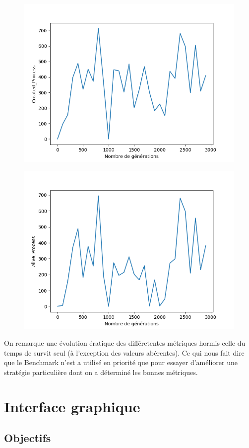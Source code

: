 \documentclass[a4paper,12pt]{article} %
\begin{document}
\begin{figure}[!ht]
\begin{minipage}{.5\textwidth}
  \label{fig:test4}
\end{minipage}
\begin{minipage}{.5\textwidth}
  \centering
  \includegraphics[width=.5\linewidth]{images/Created_Process.png}
  \label{fig:test5}
\end{minipage}
\begin{minipage}{.5\textwidth}
  \centering
  \includegraphics[width=.5\linewidth]{images/Alive_Process.png}
  \label{fig:test6}
\end{minipage}

\end{figure}

On remarque une évolution ératique des différetentes métriques hormis celle du temps de survit seul (à l'exception des valeurs abérentes).
Ce qui nous fait dire que le Benchmark n'est a utilisé en priorité que pour essayer d'améliorer une stratégie particulière dont on a déterminé les bonnes métriques.

\section{Interface graphique}

\subsection{Objectifs}
\end{document}
